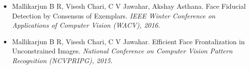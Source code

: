 \begin{itemize}

\item Mallikarjun B R, Visesh Chari, C V Jawahar, Akshay Asthana. Face Fiducial Detection by Consensus of Exemplars. \textit{IEEE Winter Conference on Applications of Computer Vision (WACV), 2016}. 

\item Mallikarjun B R, Visesh Chari, C V Jawahar. Efficient Face Frontalization in Unconstrained Images. \textit{National Conference on Computer Vision Pattern Recognition (NCVPRIPG), 2015}.

\end{itemize}
